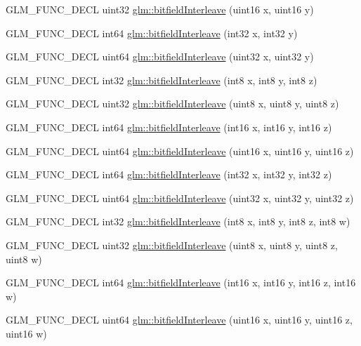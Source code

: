 \begin{DoxyCompactItemize}
G\-L\-M\-\_\-\-F\-U\-N\-C\-\_\-\-D\-E\-C\-L uint32 \hyperlink{group__gtc__bitfield_ga19ef8360379483e3ee245e89cb62ff93}{glm\-::bitfield\-Interleave} (uint16 x, uint16 y)
\item 
G\-L\-M\-\_\-\-F\-U\-N\-C\-\_\-\-D\-E\-C\-L int64 \hyperlink{group__gtc__bitfield_ga0de51d5985e6a703f305a5a61479babd}{glm\-::bitfield\-Interleave} (int32 x, int32 y)
\item 
G\-L\-M\-\_\-\-F\-U\-N\-C\-\_\-\-D\-E\-C\-L uint64 \hyperlink{group__gtc__bitfield_ga2bc87fd66f6f8471c1a46888360cef12}{glm\-::bitfield\-Interleave} (uint32 x, uint32 y)
\item 
G\-L\-M\-\_\-\-F\-U\-N\-C\-\_\-\-D\-E\-C\-L int32 \hyperlink{group__gtc__bitfield_ga6dee2ce1c45805063bb7fc5f6fd8f5ca}{glm\-::bitfield\-Interleave} (int8 x, int8 y, int8 z)
\item 
G\-L\-M\-\_\-\-F\-U\-N\-C\-\_\-\-D\-E\-C\-L uint32 \hyperlink{group__gtc__bitfield_gab9d593a2e916beb8f8137a0dbeae3afe}{glm\-::bitfield\-Interleave} (uint8 x, uint8 y, uint8 z)
\item 
G\-L\-M\-\_\-\-F\-U\-N\-C\-\_\-\-D\-E\-C\-L int64 \hyperlink{group__gtc__bitfield_gaf898f842ac089fcc8d6201c32702584a}{glm\-::bitfield\-Interleave} (int16 x, int16 y, int16 z)
\item 
G\-L\-M\-\_\-\-F\-U\-N\-C\-\_\-\-D\-E\-C\-L uint64 \hyperlink{group__gtc__bitfield_ga3c170e2ec54f2faab5e1c5bb693d718d}{glm\-::bitfield\-Interleave} (uint16 x, uint16 y, uint16 z)
\item 
G\-L\-M\-\_\-\-F\-U\-N\-C\-\_\-\-D\-E\-C\-L int64 \hyperlink{group__gtc__bitfield_ga64e2d84f6560af3cc639644b1e628c42}{glm\-::bitfield\-Interleave} (int32 x, int32 y, int32 z)
\item 
G\-L\-M\-\_\-\-F\-U\-N\-C\-\_\-\-D\-E\-C\-L uint64 \hyperlink{group__gtc__bitfield_ga7c10eb37f608365cfaef5ca2c476e1ce}{glm\-::bitfield\-Interleave} (uint32 x, uint32 y, uint32 z)
\item 
G\-L\-M\-\_\-\-F\-U\-N\-C\-\_\-\-D\-E\-C\-L int32 \hyperlink{group__gtc__bitfield_ga7da84ecc2b3a46c9c08a9f40012359cf}{glm\-::bitfield\-Interleave} (int8 x, int8 y, int8 z, int8 w)
\item 
G\-L\-M\-\_\-\-F\-U\-N\-C\-\_\-\-D\-E\-C\-L uint32 \hyperlink{group__gtc__bitfield_ga447c0bbed9d60c14578626d8f03f3755}{glm\-::bitfield\-Interleave} (uint8 x, uint8 y, uint8 z, uint8 w)
\item 
G\-L\-M\-\_\-\-F\-U\-N\-C\-\_\-\-D\-E\-C\-L int64 \hyperlink{group__gtc__bitfield_ga09ee0be0fac790a1607a711e597dd9bf}{glm\-::bitfield\-Interleave} (int16 x, int16 y, int16 z, int16 w)
\item 
G\-L\-M\-\_\-\-F\-U\-N\-C\-\_\-\-D\-E\-C\-L uint64 \hyperlink{group__gtc__bitfield_gac8a926a7bfd9b23c22a4f685193fbfe1}{glm\-::bitfield\-Interleave} (uint16 x, uint16 y, uint16 z, uint16 w)
\end{DoxyCompactItemize}


